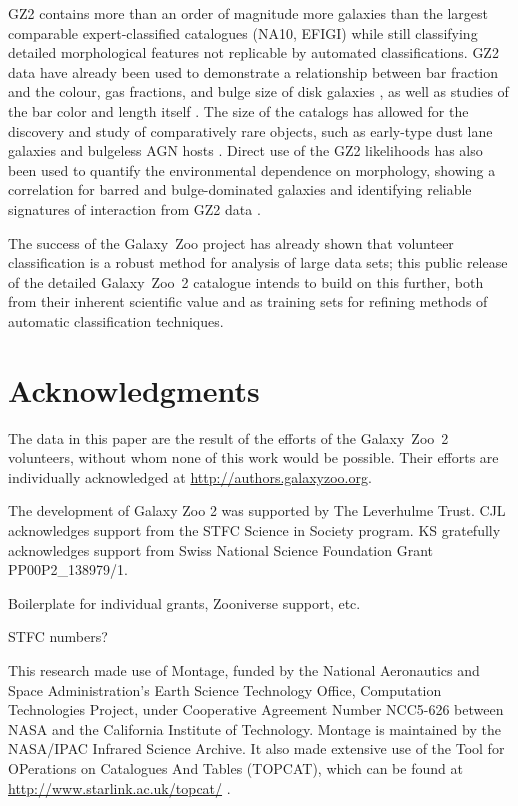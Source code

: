 \documentclass[useAMS,usenatbib]{mn2e}
\begin{document}
GZ2 contains more than an order of magnitude more galaxies than the largest comparable expert-classified catalogues (NA10, EFIGI) while still classifying detailed morphological features not replicable by automated classifications. GZ2 data have already been used to demonstrate a relationship between bar fraction and the colour, gas fractions, and bulge size of disk galaxies \citep{mas11c,mas12a}, as well as studies of the bar color and length itself \citet{hoy11}. The size of the catalogs has allowed for the discovery and study of comparatively rare objects, such as early-type dust lane galaxies \citep{kav12a} and bulgeless AGN hosts \citep{sim13}. Direct use of the GZ2 likelihoods has also been used to quantify the environmental dependence on morphology, showing a correlation for barred and bulge-dominated galaxies \citep{ski12} and identifying reliable signatures of interaction from GZ2 data \citep{cas13}. 

The success of the Galaxy~Zoo project has already shown that volunteer classification is a robust method for analysis of large data sets; this public release of the detailed Galaxy~Zoo~2 catalogue intends to build on this further, both from their inherent scientific value and as training sets for refining methods of automatic classification techniques. 


\section*{Acknowledgments}
The data in this paper are the result of the efforts of the Galaxy~Zoo~2 volunteers, without whom none of this work would be possible. Their efforts are individually acknowledged at \url{http://authors.galaxyzoo.org}. 

The development of Galaxy Zoo 2 was supported by The Leverhulme Trust. CJL acknowledges support from the STFC Science in Society program. KS gratefully acknowledges support from Swiss National Science Foundation Grant PP00P2\_138979/1. 

Boilerplate for individual grants, Zooniverse support, etc.

STFC numbers?

This research made use of Montage, funded by the National Aeronautics and Space Administration's Earth Science Technology Office, Computation Technologies Project, under Cooperative Agreement Number NCC5-626 between NASA and the California Institute of Technology. Montage is maintained by the NASA/IPAC Infrared Science Archive. It also made extensive use of the Tool for OPerations on Catalogues And Tables (TOPCAT), which can be found at \url{http://www.starlink.ac.uk/topcat/} \citep{tay05,tay11}. 
\end{document}
